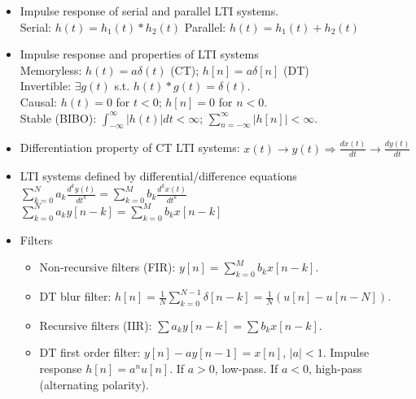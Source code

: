 \documentclass[10pt, twocolumn]{article}
\begin{document}
\begin{itemize}
    $a^n u[n] \ast b^n u[n] = \frac{a^{n+1} - b^{n+1}}{a-b} u[n], \text{ for } a \neq b.$
    \item Impulse response of serial and parallel LTI systems. \\
    Serial: $h(t) = h_1(t) * h_2(t)$ \quad Parallel: $h(t) = h_1(t) + h_2(t)$
    \item Impulse response and properties of LTI systems \\
    Memoryless: $h(t) = a\delta(t)$ (CT); $h[n]=a\delta[n]$ (DT) \\
    Invertible: $\exists g(t)$ s.t. $h(t) * g(t) = \delta(t)$. \\
    Causal: $h(t)=0$ for $t<0$; $h[n]=0$ for $n<0$. \\
    Stable (BIBO): $\int_{-\infty}^{\infty} |h(t)| dt < \infty$; $\sum_{n=-\infty}^{\infty} |h[n]| < \infty$.
    \item Differentiation property of CT LTI systems: $x(t) \to y(t) \Rightarrow \frac{dx(t)}{dt} \to \frac{dy(t)}{dt}$
    \item LTI systems defined by differential/difference equations \\
    $\sum_{k=0}^N a_k \frac{d^k y(t)}{dt^k} = \sum_{k=0}^M b_k \frac{d^k x(t)}{dt^k}$ \\ $\sum_{k=0}^N a_k y[n-k] = \sum_{k=0}^M b_k x[n-k]$
    \item Filters
        \begin{itemize}
        \item Non-recursive filters (FIR): $y[n] = \sum_{k=0}^M b_k x[n-k]$.
        \item DT blur filter: $h[n] = \frac{1}{N}\sum_{k=0}^{N-1} \delta[n-k] = \frac{1}{N}(u[n] - u[n-N])$.
        \item Recursive filters (IIR): $\sum a_k y[n-k] = \sum b_k x[n-k]$.
        \item DT first order filter: $y[n] - ay[n-1] = x[n]$, $|a|<1$. Impulse response $h[n] = a^n u[n]$. If $a>0$, low-pass. If $a<0$, high-pass (alternating polarity).
        \end{itemize}
\end{itemize}

\end{document}
